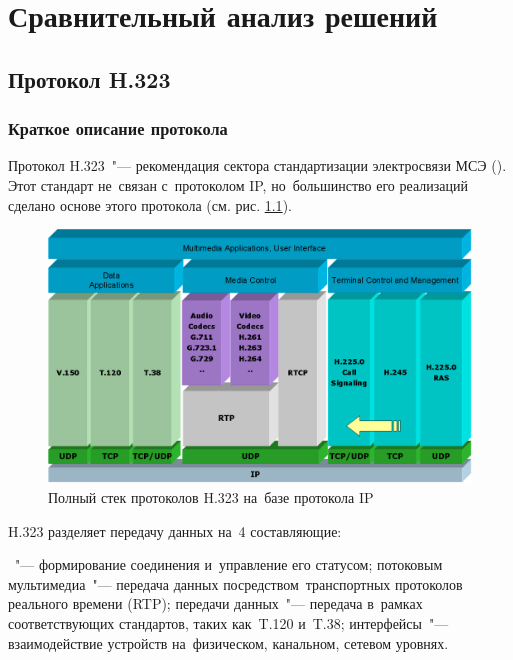 \chapter{Сравнительный анализ решений}

\section{Протокол H.323}

\subsection{Краткое описание протокола}

Протокол H.323~"--- рекомендация сектора стандартизации электросвязи МСЭ ().
Этот стандарт не~связан с~протоколом IP, но~большинство его реализаций сделано основе этого протокола (см. рис. \ref{fig:H232stack}).

\begin{figure}
    \includegraphics[width = \columnwidth]{figures/H323Stack.png}
    \caption{Полный стек протоколов H.323 на~базе протокола IP}
    \label{fig:H232stack}
\end{figure}

H.323 разделяет передачу данных на~4 составляющие:\listnopagebreak
\begin{enumerate}
    ~"--- формирование соединения и~управление его статусом;
		 потоковым мультимедиа~"--- передача данных посредством~транспортных протоколов реального времени (RTP);
		 передачи данных~"--- передача в~рамках соответствующих стандартов, таких как~T.120 и~T.38;
		 интерфейсы~"--- взаимодействие устройств на~физическом, канальном, сетевом уровнях.
\end{enumerate}


